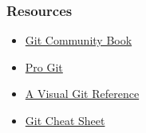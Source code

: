 \documentclass[11pt]{beamer}
\begin{document}

\begin{frame}[fragile]
\frametitle{Resources}

\begin{itemize}
\item \href{http://book.git-scm.com/}{Git Community Book}
\item  \href{http://progit.org/book/}{Pro Git}
\item \href{http://marklodato.github.io/visual-git-guide/index-en.html}{A Visual Git Reference}
\item \textcolor{red}{\href{https://education.github.com/git-cheat-sheet-education.pdf}{Git Cheat Sheet}}
\end{itemize}


\end{frame}
\end{document}

